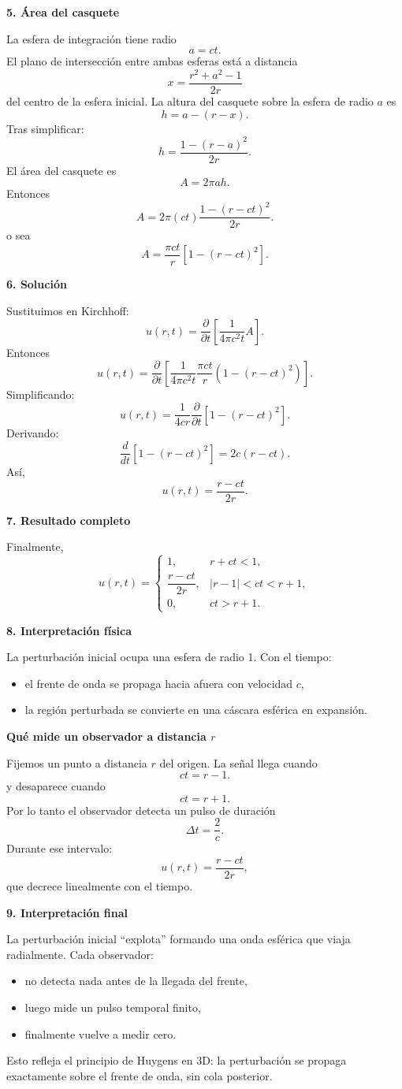\documentclass[11pt,spanish]{article}
\begin{document}
{\bf 5. Área del casquete}

La esfera de integración tiene radio
$$
a=ct.
$$
El plano de intersección entre ambas esferas está a distancia
$$
x=\frac{r^2+a^2-1}{2r}
$$
del centro de la esfera inicial.
La altura del casquete sobre la esfera de radio $a$ es
$$
h=a-(r-x).
$$
Tras simplificar:
$$
h
=
\frac{1-(r-a)^2}{2r}.
$$
El área del casquete es
$$
A=2\pi ah.
$$
Entonces
$$
A
=
2\pi(ct)
\frac{1-(r-ct)^2}{2r}.
$$
o sea
$$
A
=
\frac{\pi ct}{r}
\left[
1-(r-ct)^2
\right].
$$

{\bf 6. Solución}

Sustituimos en Kirchhoff:
$$
u(r,t)
=
\frac{\partial}{\partial t}
\left[
\frac1{4\pi c^2 t}
A
\right].
$$
Entonces
$$
u(r,t)
=
\frac{\partial}{\partial t}
\left[
\frac1{4\pi c^2 t}
\frac{\pi ct}{r}
(1-(r-ct)^2)
\right].
$$
Simplificando:
$$
u(r,t)
=
\frac1{4cr}
\frac{\partial}{\partial t}
\left[
1-(r-ct)^2
\right].
$$
Derivando:
$$
\frac{d}{dt}
[1-(r-ct)^2]
=
2c(r-ct).
$$
Así,
$$
u(r,t)
=
\frac{r-ct}{2r}.
$$

{\bf 7. Resultado completo}

Finalmente,
$$
\boxed{
u(r,t)=
\begin{cases}
1,
&
r+ct<1,\\
\dfrac{r-ct}{2r},
&
|r-1|<ct<r+1,\\
0,
&
ct>r+1.
\end{cases}
}
$$

{\bf 8. Interpretación física}

La perturbación inicial ocupa una esfera de radio 1.
Con el tiempo:
\begin{itemize}
\item el frente de onda se propaga hacia afuera con velocidad $c$,
\item la región perturbada se convierte en una cáscara esférica en expansión.
\end{itemize}

{\bf Qué mide un observador a distancia $r$}

Fijemos un punto a distancia $r$ del origen.
La señal llega cuando
$$
ct=r-1.
$$
y desaparece cuando
$$
ct=r+1.
$$
Por lo tanto el observador detecta un pulso de duración
$$
\Delta t=\frac2c.
$$
Durante ese intervalo:
$$
u(r,t)=\frac{r-ct}{2r},
$$
que decrece linealmente con el tiempo.

{\bf 9. Interpretación final}

La perturbación inicial ``explota'' formando una onda esférica que viaja radialmente.
Cada observador:
\begin{itemize}
\item no detecta nada antes de la llegada del frente,
\item luego mide un pulso temporal finito,
\item finalmente vuelve a medir cero.
\end{itemize}
Esto refleja el principio de Huygens en 3D: la perturbación se propaga exactamente sobre el frente de onda, sin cola posterior.
\end{document}
